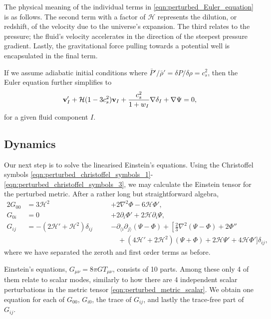 The physical meaning of the individual terms in \eqref{eqn:perturbed_Euler_equation} is as follows. The second term with a factor of $\mathcal{H}$ represents the dilution, or redshift, of the velocity due to the universe's expansion. The third relates to the pressure; the fluid's velocity accelerates in the direction of the steepest pressure gradient. Lastly, the gravitational force pulling towards a potential well is encapsulated in the final term.

If we assume adiabatic initial conditions where $\bar{P}'/\bar{\rho}' = \delta P / \delta \rho = c^2_s$, then the Euler equation further simplifies to
\begin{align}
	\mathbf{v}'_I + \mathcal{H} (1 - 3c^2_s) \mathbf{v}_I + \frac{c^2_s}{1+w_I} \nabla\delta_I + \nabla\Psi = 0,
\end{align}
for a given fluid component $I$.


\subsection{Dynamics}

Our next step is to solve the linearised Einstein's equations. Using the Christoffel symbols \eqref{eqn:perturbed_christoffel_symbols_1}-\eqref{eqn:perturbed_christoffel_symbols_3}, we may calculate the Einstein tensor for the perturbed metric. After a rather long but straightforward algebra,
\begin{alignat}{2}
	G_{00} &= 3\mathcal{H}^2 \quad&&+ 2\nabla^2 \Phi - 6 \mathcal{H} \Phi', \label{eqn:perturbed_einstein_tensor_1}\\
	G_{0i} &= 0 \quad&&+ 2\partial_i \Phi' + 2 \mathcal{H} \partial_i \Psi, \label{eqn:perturbed_einstein_tensor_2}\\
	G_{ij} &= -(2\mathcal{H}' + \mathcal{H}^2) \delta_{ij} \quad&&- \partial_{\langle i} \partial_{j \rangle} (\Psi - \Phi) + \left[ \frac{2}{3}\nabla^2 (\Psi-\Phi) + 2\Phi'' \right. \nonumber\\
	& &&\quad + (4\mathcal{H}' + 2\mathcal{H}^2)(\Psi+\Phi) + 2\mathcal{H}\Psi' + 4\mathcal{H}\Phi' \biggr] \delta_{ij}, \label{eqn:perturbed_einstein_tensor_3}
\end{alignat}
where we have separated the zeroth and first order terms as before.

Einstein's equations, $G_{\mu\nu} = 8\pi G T_{\mu\nu}$, consists of 10 parts. Among these only 4 of them relate to scalar modes, similarly to how there are 4 independent scalar perturbations in the metric tensor \eqref{eqn:perturbed_metric_scalar}. We obtain one equation for each of $G_{00}$, $G_{i0}$, the trace of $G_{ij}$, and lastly the trace-free part of $G_{ij}$.

